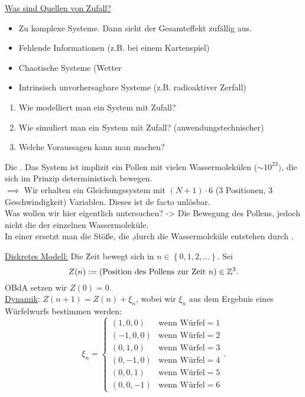 \underline{Was sind Quellen von Zufall?}
\begin{itemize}
    \item Zu komplexe Systeme. Dann sieht der Gesamteffekt zufällig aus.
    \item Fehlende Informationen (z.B. bei einem Kartenspiel)
    \item Chaotische Systeme (Wetter
    \item Intrinsisch unvorhersagbare Systeme (z.B. radioaktiver Zerfall)
\end{itemize}
\begin{question}
    \begin{enumerate}[(1)]
        \item Wie modelliert man ein System mit Zufall?
        \item Wie simuliert man ein System mit Zufall? (anwendungstechnischer)
        \item Welche Voraussagen kann man machen?
    \end{enumerate}
\end{question}


\begin{example}
    Die . Das System ist implizit ein Pollen mit vielen Wassermolekülen ($\sim 10^{23})$, die sich im Prinzip deterministisch bewegen. \\
    $\implies$ Wir erhalten ein Gleichungssystem mit $(N+1)\cdot 6$ (3 Positionen, 3 Geschwindigkeit) Variablen. Dieses ist de facto unlösbar. \\

    Was wollen wir hier eigentlich untersuchen? -> Die Bewegung des Pollens, jedoch nicht die der einzelnen Wassermoleküle. \\
    In einer  ersetzt man die Stöße, die ,durch die Wassermoleküle entstehen durch . 
\end{example}

\underline{Diskretes Modell:} Die Zeit bewegt sich in $n\in \left \{0,1,2,\ldots\right\} $. Sei
\[
    Z(n) := (\text{Position des Pollens zur Zeit $n$}) \in  \mathbb{Z}^3
.\] 
OBdA setzen wir $Z(0) = 0$. \\
\underline{Dynamik}: $Z(n+1) = Z(n) + \xi_n$, wobei wir $\xi_n$ aus dem Ergebnis eines Würfelwurfs bestimmen werden:
 \[
\xi_n = \begin{cases}
    (1,0,0) & \text{wenn Würfel}=1 \\
    (-1,0,0) & \text{wenn Würfel}=2 \\
    (0,1,0) & \text{wenn Würfel}=3 \\
    (0,-1,0) & \text{wenn Würfel}=4 \\
    (0,0,1) & \text{wenn Würfel}=5 \\
    (0,0,-1) & \text{wenn Würfel}=6
\end{cases}
.\] 

